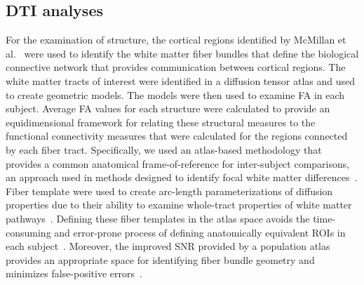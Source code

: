 \subsection{DTI analyses}
For the examination of structure, the cortical regions identified by McMillan et al.\ \cite{McMillan2010} were used to identify the white matter fiber bundles that define the biological connective network that provides communication between cortical regions. The white matter tracts of interest were identified in a diffusion tensor atlas and used to create geometric models. The models were then used to examine FA in each subject. Average FA values for each structure were calculated to provide an equidimensional framework for relating these structural measures to the functional connectivity measures that were calculated for the regions connected by each fiber tract. Specifically, we used an atlas-based methodology that provides a common anatomical frame-of-reference for inter-subject comparisons, an approach used in methods designed to identify focal white matter differences~\cite{Yushkevich2008,Goodlett2009a,Jones2002,Xu2003,Smith2006}. Fiber template were used to create arc-length parameterizations of diffusion properties due to their ability to examine whole-tract properties of white matter pathways~\cite{Jones2005,Corouge2006,Maddah2008d,Lin2006,ODonnell2009,Davis2009,Goodlett2009a,Batchelor2006}. Defining these fiber templates in the atlas space avoids the time-consuming and error-prone process of defining anatomically equivalent ROIs in each subject~\cite{Gilmore2007}. Moreover, the improved SNR provided by a population atlas provides an appropriate space for identifying fiber bundle geometry and minimizes false-positive errors~\cite{Goodlett2009a}. 

